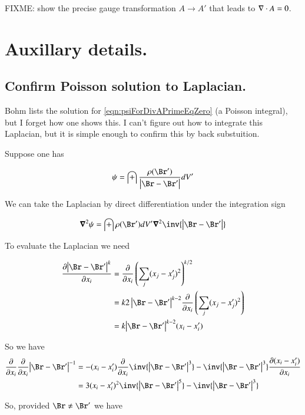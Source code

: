 \documentclass{article}
\begin{document}
FIXME: show the precise gauge transformation $A \rightarrow A'$ that leads to $\nabla \cdot A = 0$.

\section{ Auxillary details. }

\subsection{ Confirm Poisson solution to Laplacian. }

Bohm lists the solution for \ref{eqn:psiForDivAPrimeEqZero} (a Poisson integral), but I forget how one shows this.  I can't figure out how to integrate this Laplacian, but it is simple enough to confirm this by back substuition.

Suppose one has

\begin{align*}
\psi = \int \frac{\rho(\Br')}{\Abs{\Br - \Br'}} dV'
\end{align*}

We can take the Laplacian by direct differentiation under the integration sign

\begin{align*}
\spacegrad^2 \psi = \int {\rho(\Br')} dV' \spacegrad^2 \inv{\Abs{\Br - \Br'}}
\end{align*}

To evaluate the Laplacian we need

\begin{align*}
\PD{x_i}{\Abs{\Br - \Br'}^k} 
&= \PD{x_i}{} \left(\sum_j (x_j - x_j')^2 \right)^{k/2} \\
&= k { 2\Abs{\Br - \Br'}^{k-2}} \PD{x_i}{} \left(\sum_j (x_j - x_j')^2 \right) \\
&= k { \Abs{\Br - \Br'}^{k-2}} (x_i - x_i')
\end{align*}

So we have
\begin{align*}
\PD{x_i}{} \PD{x_i}{} {\Abs{\Br - \Br'}^{-1}} 
&= 
- (x_i - x_i') \PD{x_i}{}{ \inv{ \Abs{\Br - \Br'}^3} } 
- \inv{ \Abs{\Br - \Br'}^3} \PD{x_i}{ (x_i - x_i') } \\
&= 
3 (x_i - x_i')^2 { \inv{ \Abs{\Br - \Br'}^5} } 
- \inv{ \Abs{\Br - \Br'}^3} \\
\end{align*}

So, provided $\Br \ne \Br'$ we have
\end{document}
